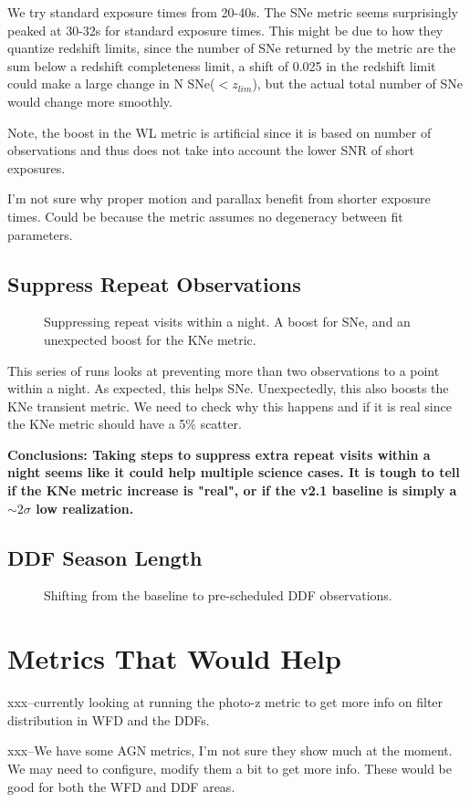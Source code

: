 We try standard exposure times from 20-40s.  The SNe metric seems surprisingly peaked at 30-32s for standard exposure times. This might be due to how they quantize redshift limits, since the number of SNe returned by the metric are the sum below a redshift completeness limit, a shift of 0.025 in the redshift limit could make a large change in N SNe($<z_{lim}$), but the actual total number of SNe would change more smoothly. 

Note, the boost in the WL metric is artificial since it is based on number of observations and thus does not take into account the lower SNR of short exposures. 


I'm not sure why proper motion and parallax benefit from shorter exposure times. Could be because the metric assumes no degeneracy between fit parameters. 

\subsection{Suppress Repeat Observations}


\begin{figure}
\caption{Suppressing repeat visits within a night. A boost for SNe, and an unexpected boost for the KNe metric. }
\end{figure}


This series of runs looks at preventing more than two observations to a point within a night. As expected, this helps SNe. Unexpectedly, this also boosts the KNe transient metric. We need to check why this happens and if it is real since the KNe metric should have a 5\% scatter.


{\bf Conclusions:  Taking steps to suppress extra repeat visits within a night seems like it could help multiple science cases. It is tough to tell if the KNe metric increase is "real", or if the v2.1 baseline is simply a $\sim 2\sigma$ low realization.}


\subsection{DDF Season Length}



\begin{figure}
\caption{Shifting from the baseline to pre-scheduled DDF observations.}
\end{figure}

\section{Metrics That Would Help}

xxx--currently looking at running the photo-z metric to get more info on filter distribution in WFD and the DDFs.

xxx--We have some AGN metrics, I'm not sure they show much at the moment. We may need to configure, modify them a bit to get more info. These would be good for both the WFD and DDF areas. 

